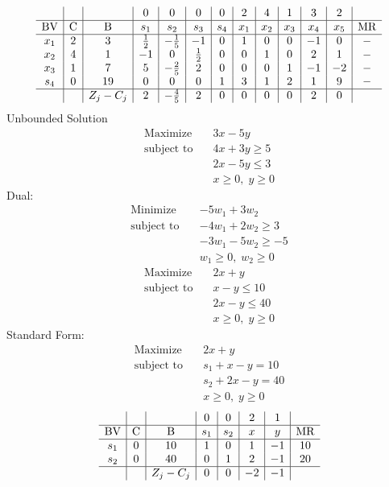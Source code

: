 \documentclass{article}
\begin{document}
\begin{align*}
\begin{array}{c|c|c|c|c|c|c|c|c|c|c|c|c}
 &  &  & 0 & 0 & 0 & 0 & 2 & 4 & 1 & 3 & 2 & \\
\hline
\text{BV} & \text{C} & \text{B} & s_{1} & s_{2} & s_{3} & s_{4} & x_{1} & x_{2} & x_{3} & x_{4} & x_{5} & \text{MR} \\
\hline
x_{1} & 2 & 3 & \frac{1}{2} & -\frac{1}{5} & -1 & 0 & 1 & 0 & 0 & -1 & 0 & - \\
x_{2} & 4 & 1 & -1 & 0 & \frac{1}{2} & 0 & 0 & 1 & 0 & 2 & 1 & - \\
x_{3} & 1 & 7 & 5 & -\frac{2}{5} & 2 & 0 & 0 & 0 & 1 & -1 & -2 & - \\
s_{4} & 0 & 19 & 0 & 0 & 0 & 1 & 3 & 1 & 2 & 1 & 9 & - \\
\hline
 &  & Z_j-C_j & 2 & -\frac{4}{5} & 2 & 0 & 0 & 0 & 0 & 2 & 0 & \\
\end{array}
\end{align*}
Unbounded Solution\\
\begin{align*}
\text{Maximize} \quad & 3x - 5y\\
\text{subject to} \quad
& 4x + 3y\ge5\\
& 2x - 5y\le3\\
& x\ge0,\; y\ge0\end{align*}
Dual:\\
\begin{align*}
\text{Minimize} \quad & -5w_{1} + 3w_{2}\\
\text{subject to} \quad
& -4w_{1} + 2w_{2}\ge3\\
& -3w_{1} - 5w_{2}\ge-5\\
& w_{1}\ge0,\; w_{2}\ge0\end{align*}
\begin{align*}
\text{Maximize} \quad & 2x + y\\
\text{subject to} \quad
& x - y\le10\\
& 2x - y\le40\\
& x\ge0,\; y\ge0\end{align*}
Standard Form:\\
\begin{align*}
\text{Maximize} \quad & 2x + y\\
\text{subject to} \quad
& s_{1} + x - y=10\\
& s_{2} + 2x - y=40\\
& x\ge0,\; y\ge0\end{align*}
\begin{align*}
\begin{array}{c|c|c|c|c|c|c|c}
 &  &  & 0 & 0 & 2 & 1 & \\
\hline
\text{BV} & \text{C} & \text{B} & s_{1} & s_{2} & x & y & \text{MR} \\
\hline
s_{1} & 0 & 10 & 1 & 0 & 1 & -1 & 10 \\
s_{2} & 0 & 40 & 0 & 1 & 2 & -1 & 20 \\
\hline
 &  & Z_j-C_j & 0 & 0 & -2 & -1 & \\
\end{array}
\end{align*}
\end{document}
